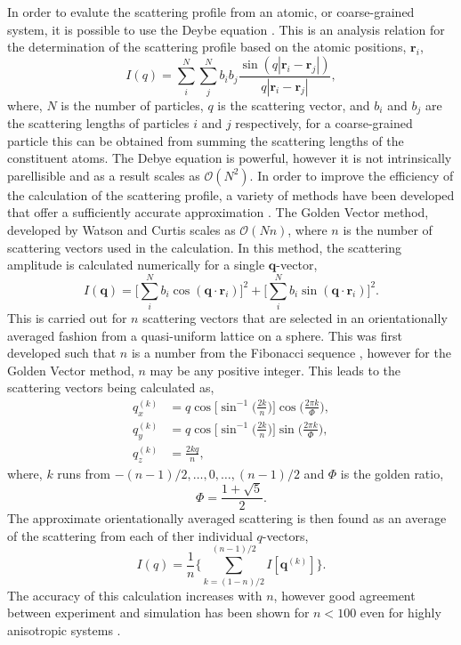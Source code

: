 In order to evalute the scattering profile from an atomic, or coarse-grained system, it is possible to use the Deybe equation \cite{Debye1915}.
This is an analysis relation for the determination of the scattering profile based on the atomic positions, $\mathbf{r}_i$,
%
\begin{equation}
	I(q) = \sum_{i}^{N}\sum_{j}^{N} b_ib_j\frac{\sin{(q|\mathbf{r}_i-\mathbf{r}_j|)}}{q|\mathbf{r}_i-\mathbf{r}_j|},
\end{equation}
%
where, $N$ is the number of particles, $q$ is the scattering vector, and $b_i$ and $b_j$ are the scattering lengths of particles $i$ and $j$ respectively, for a coarse-grained particle this can be obtained from summing the scattering lengths of the constituent atoms.
The Debye equation is powerful, however it is not intrinsically parellisible and as a result scales as $\mathcal{O}(N^2)$.
In order to improve the efficiency of the calculation of the scattering profile, a variety of methods have been developed that offer a sufficiently accurate approximation \cite{Svergun1994,Watson2013}.
The Golden Vector method, developed by Watson and Curtis \cite{Watson2013} scales as $\mathcal{O}(Nn)$, where $n$ is the number of scattering vectors used in the calculation.
In this method, the scattering amplitude is calculated numerically for a single $\mathbf{q}$-vector,
%
\begin{equation}
	I(\mathbf{q}) = \Bigg[\sum_{i}^{N}b_i\cos{(\mathbf{q}\cdot\mathbf{r}_i)}\Bigg]^2 + \Bigg[\sum_{i}^{N}b_i\sin{(\mathbf{q}\cdot\mathbf{r}_i)}\Bigg]^2.
\end{equation}
%
This is carried out for $n$ scattering vectors that are selected in an orientationally averaged fashion from a quasi-uniform lattice on a sphere.
This was first developed such that $n$ is a number from the Fibonacci sequence \cite{Svergun1994}, however for the Golden Vector method, $n$ may be any positive integer.
This leads to the scattering vectors being calculated as,
%
\begin{equation}
	\begin{aligned}
		q_x^{(k)} & = q\cos\Bigg[\sin^{-1}\bigg(\frac{2k}{n}\bigg)\Bigg]\cos\bigg(\frac{2\pi k}{\Phi}\bigg), \\
		q_y^{(k)} & = q\cos\Bigg[\sin^{-1}\bigg(\frac{2k}{n}\bigg)\Bigg]\sin\bigg(\frac{2\pi k}{\Phi}\bigg), \\
		q_z^{(k)} & = \frac{2 k q}{n},
	\end{aligned}
\end{equation}
%
where, $k$ runs from $-(n-1)/2,\ldots,0,\ldots,(n-1)/2$ and $\Phi$ is the golden ratio,
%
\begin{equation}
	\Phi = \frac{1+\sqrt{5}}{2}.
\end{equation}
%
The approximate orientationally averaged scattering is then found as an average of the scattering from each of ther individual $q$-vectors,
%
\begin{equation}
	I(q) = \frac{1}{n}\Bigg\{\sum_{k=(1-n)/2}^{(n-1)/2} I[\mathbf{q}^{(k)}]\Bigg\}.
\end{equation}
%
The accuracy of this calculation increases with $n$, however good agreement between experiment and simulation has been shown for $n < 100$ even for highly anisotropic systems \cite{Watson2013}.


